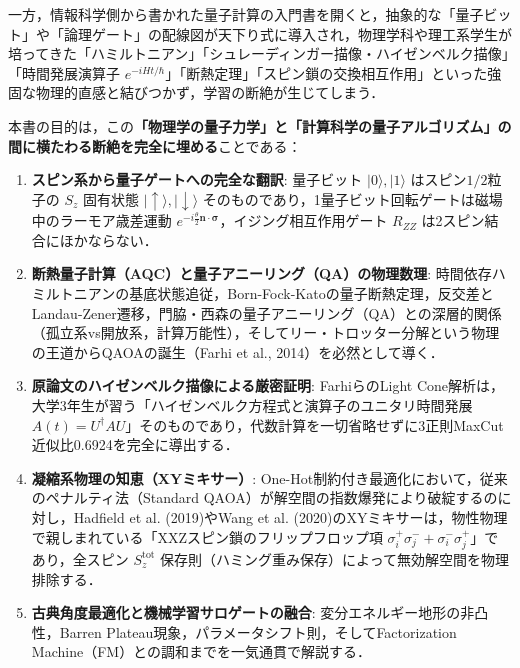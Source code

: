 \documentclass[11pt,a4paper,oneside,openany]{ltjsbook}
\theoremstyle{definition}
\theoremstyle{plain}
\theoremstyle{remark}
\newcommand{\ket}[1]{|#1\rangle}
\begin{document}
一方，情報科学側から書かれた量子計算の入門書を開くと，抽象的な「量子ビット」や「論理ゲート」の配線図が天下り式に導入され，物理学科や理工系学生が培ってきた「ハミルトニアン」「シュレーディンガー描像・ハイゼンベルク描像」「時間発展演算子 $e^{-i H t / \hbar}$」「断熱定理」「スピン鎖の交換相互作用」といった強固な物理的直感と結びつかず，学習の断絶が生じてしまう．

本書の目的は，この\textbf{「物理学の量子力学」と「計算科学の量子アルゴリズム」の間に横たわる断絶を完全に埋める}ことである：
\begin{enumerate}\setlength{\itemsep}{2pt}
    \item \textbf{スピン系から量子ゲートへの完全な翻訳}: 量子ビット $\ket{0}, \ket{1}$ はスピン$1/2$粒子の $S_z$ 固有状態 $\ket{\uparrow}, \ket{\downarrow}$ そのものであり，1量子ビット回転ゲートは磁場中のラーモア歳差運動 $e^{-i \frac{\theta}{2} \bm{n}\cdot\bm{\sigma}}$，イジング相互作用ゲート $R_{ZZ}$ は2スピン結合にほかならない\cite{nielsen2010quantum,barenco1995elementary}．
    \item \textbf{断熱量子計算（AQC）と量子アニーリング（QA）の物理数理}: 時間依存ハミルトニアンの基底状態追従，Born-Fock-Katoの量子断熱定理\cite{born1928beweis,kato1950adiabatic}，反交差とLandau-Zener遷移\cite{landau1932theorie,zener1932non}，門脇・西森の量子アニーリング（QA\cite{kadowaki1998quantum}）との深層的関係（孤立系vs開放系，計算万能性\cite{aharonov2007adiabatic}），そしてリー・トロッター分解\cite{trotter1959product,suzuki1976generalized,lloyd1996universal}という物理の王道からQAOAの誕生（Farhi et al., 2014\cite{farhi2014quantum}）を必然として導く．
    \item \textbf{原論文のハイゼンベルク描像による厳密証明}: FarhiらのLight Cone解析は，大学3年生が習う「ハイゼンベルク方程式と演算子のユニタリ時間発展 $A(t) = U^\dagger A U$」そのものであり，代数計算を一切省略せずに3正則MaxCut近似比0.6924を完全に導出する．
    \item \textbf{凝縮系物理の知恵（XYミキサー）}: One-Hot制約付き最適化において，従来のペナルティ法（Standard QAOA\cite{lucas2014ising}）が解空間の指数爆発により破綻するのに対し，Hadfield et al. (2019)\cite{hadfield2019from}やWang et al. (2020)\cite{wang2020xy}のXYミキサーは，物性物理で親しまれている「XXZスピン鎖のフリップフロップ項 $\sigma_i^+ \sigma_j^- + \sigma_i^- \sigma_j^+$」であり，全スピン $S_z^{\text{tot}}$ 保存則（ハミング重み保存）によって無効解空間を物理排除する．
    \item \textbf{古典角度最適化と機械学習サロゲートの融合}: 変分エネルギー地形の非凸性，Barren Plateau現象\cite{mcclean2018barren,wang2021noise}，パラメータシフト則\cite{mitarai2018quantum,schuld2019evaluating}，そしてFactorization Machine（FM\cite{rendle2010factorization,kitai2020designing}）との調和までを一気通貫で解説する．
\end{enumerate}
\end{document}
